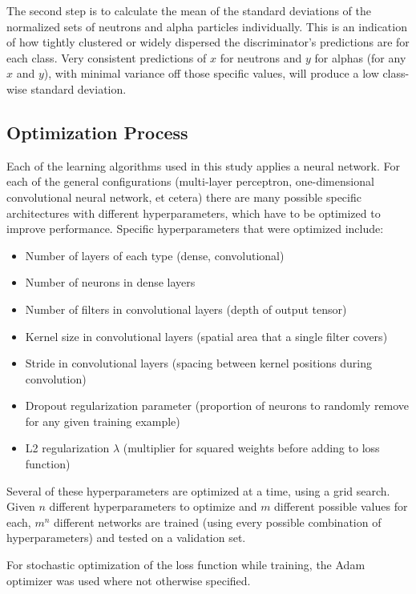\documentclass[10pt]{article}
\begin{document}
The second step is to calculate the mean of the standard deviations of the normalized sets of neutrons and alpha particles individually. This is an indication of how tightly clustered or widely dispersed the discriminator’s predictions are for each class. Very consistent predictions of $x$ for neutrons and $y$ for alphas (for any $x$ and $y$), with minimal variance off those specific values, will produce a low class-wise standard deviation.

\subsection{Optimization Process}

Each of the learning algorithms used in this study applies a neural network. For each of the general configurations (multi-layer perceptron, one-dimensional convolutional neural network, et cetera) there are many possible specific architectures with different hyperparameters, which have to be optimized to improve performance. Specific hyperparameters that were optimized include:

\begin{itemize}
    \item Number of layers of each type (dense, convolutional)
    \item Number of neurons in dense layers
    \item Number of filters in convolutional layers (depth of output tensor)
    \item Kernel size in convolutional layers (spatial area that a single filter covers)
    \item Stride in convolutional layers (spacing between kernel positions during convolution)
    \item Dropout regularization parameter (proportion of neurons to randomly remove for any given training example)
    \item L2 regularization $\lambda$ (multiplier for squared weights before adding to loss function)
\end{itemize}


Several of these hyperparameters are optimized at a time, using a grid search. Given $n$ different hyperparameters to optimize and $m$ different possible values for each, $m^n$ different networks are trained (using every possible combination of hyperparameters) and tested on a validation set.

For stochastic optimization of the loss function while training, the Adam \cite{adam} optimizer was used where not otherwise specified.
\end{document}
